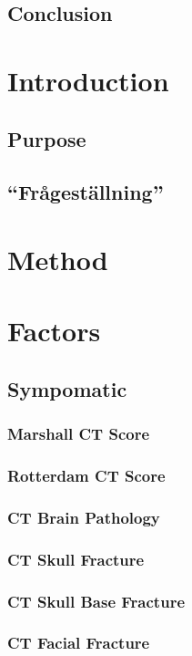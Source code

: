 \documentclass[11pt]{article}
\begin{document}
\subsection*{Conclusion}

\tableofcontents

\section{Introduction}

\subsection{Purpose}

\subsection{``Frågeställning''}

\section{Method}

\section{Factors}
\subsection{Sympomatic}
\subsubsection{Marshall CT Score}
\subsubsection{Rotterdam CT Score}
\subsubsection{CT Brain Pathology}
\subsubsection{CT Skull Fracture}
\subsubsection{CT Skull Base Fracture}
\subsubsection{CT Facial Fracture}
\end{document}
